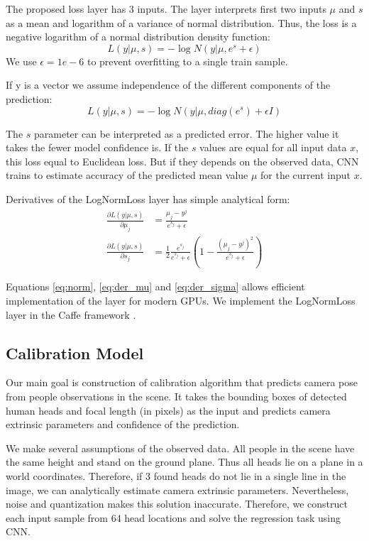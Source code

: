 The proposed loss layer has 3 inputs. The layer interprets first two inputs $\mu$ and $s$ as a mean and logarithm of a variance of normal distribution. Thus, the loss is a negative logarithm of a normal distribution density function:
\begin{equation}
L(y |\mu, s) = -\log N(y|\mu, e^{s} + \epsilon)
\end{equation}
We use $\epsilon = 1e-6$ to prevent overfitting to a single train sample.

If y is a vector we assume independence of the different components of the prediction:
\begin{equation}
L(y | \mu, s) = -\log N(y|\mu, diag\left(e^{s}\right) + \epsilon I)  \label{eq:norm}
\end{equation}

The $s$ parameter can be interpreted as a predicted error. The higher value it takes the fewer model confidence is. If the $s$ values are equal for all input data $x$, this loss equal to Euclidean loss. But if they depends on the observed data, CNN trains to estimate accuracy of the predicted mean value $\mu$ for the current input $x$.

Derivatives of the LogNormLoss layer has simple analytical form:
\begin{align}
\frac{\partial L(y | \mu, s)}{\partial \mu_j} &= 
\frac{\mu_j - y^j}{e^{s_j} + \epsilon}
\label{eq:der_mu} \\
\frac{\partial L(y | \mu, s)}{\partial s_j} &= 
\frac{1}{2}\frac{e^{s_j}}{e^{s_j} + \epsilon}
\left(1 - \frac{(\mu_j - y^j) ^ 2}{e^{s_j} + \epsilon}\right)  \label{eq:der_sigma}
\end{align}

Equations \eqref{eq:norm}, \eqref{eq:der_mu} and \eqref{eq:der_sigma} allows efficient implementation of the layer for modern GPUs. We implement the LogNormLoss layer in the Caffe framework \cite{jia2014caffe}.

\subsection{Calibration Model}
\label{sec:calibration}

Our main goal is construction of calibration algorithm that predicts camera pose from people observations in the scene. It takes the bounding boxes of detected human heads and focal length (in pixels) as the input and predicts camera extrinsic parameters and confidence of the prediction.

We make several assumptions of the observed data. All people in the scene have the same height and stand on the ground plane. Thus all heads lie on a plane in a world coordinates. Therefore, if 3 found heads do not lie in a single line in the image, we can analytically estimate camera extrinsic parameters. Nevertheless, noise and quantization makes this solution inaccurate. Therefore, we construct each input sample from 64 head locations and solve the regression task using CNN.

